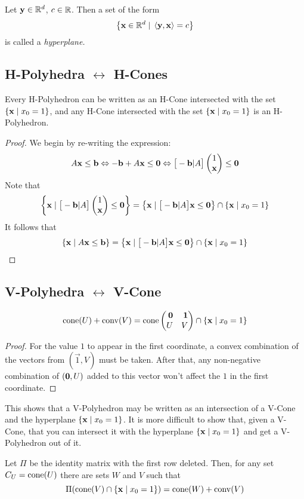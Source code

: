 \begin{Def}[Hyperplane]
	Let $\mathbf{y} \in \mathbb{R}^d$, $c \in \mathbb{R}$.  Then a set of the form
	\[ \left\{\mathbf{x} \in \mathbb{R}^d \;|\; \left\langle \mathbf{y}, \mathbf{x} \right\rangle = c\right\} \]
	is called a \em{hyperplane}.
\end{Def}

\subsection{H-Polyhedra $\leftrightarrow$ H-Cones}

\newcommand{\hpxz}{\set{\x\st x_0 = 1}}
\begin{Prop}
	Every H-Polyhedron can be written as an H-Cone intersected with the set $\hpxz$, and any H-Cone intersected with the set $\hpxz$ is an H-Polyhedron.
\end{Prop}

\begin{proof}
	We begin by re-writing the expression:
	\[	A\x \leq \b \Leftrightarrow -\b + A\x \leq \0 \Leftrightarrow
		\big[-\b|A\big]\onex \leq \0 \]
	Note that
	\[\set{\x \st \big[-\b|A\big]\onex \leq \0} = \HC{\big[-\b|A\big]} \cap \hpxz \]
	It follows that
	\[ \HP{A}{\b} = \HC{\big[-\b|A\big]} \cap \hpxz \]
\end{proof}

\subsection{V-Polyhedra $\leftrightarrow$ V-Cone}

\begin{Prop}
	\[ \VP{U}{V} = \cone\pmb \0 & \1 \\ U & V \pme \cap \hpxz \]
\end{Prop}

\begin{proof}
	For the value $1$ to appear in the first coordinate, a convex combination of the vectors from $(\vec{1}, V)$ must be taken.  After that, any non-negative combination of $(\mathbf{0},U)$ added to this vector won't affect the $1$ in the first coordinate.
\end{proof}

This shows that a V-Polyhedron may be written as an intersection of a V-Cone and the hyperplane $\hpxz$.  It is more difficult to show that, given a V-Cone, that you can intersect it with the hyperplane $\hpxz$ and get a V-Polyhedron out of it.

\begin{Prop}
	Let $\Pi$ be the identity matrix with the first row deleted.  Then, for any set $C_U = \operatorname{cone}(U)$ there are sets $W$ and $V$ such that
	\[ \Pi(\cone(V) \cap \hpxz) = \VP{W}{V} \]
\end{Prop}

